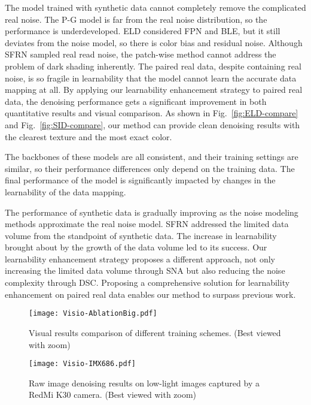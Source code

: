 \documentclass[sigconf,screen,nonacm]{acmart}
\begin{document}
The model trained with synthetic data cannot completely remove the complicated real noise. The P-G model is far from the real noise distribution, so the performance is underdeveloped. ELD considered FPN and BLE, but it still deviates from the noise model, so there is color bias and residual noise. Although SFRN sampled real read noise, the patch-wise method cannot address the problem of dark shading inherently. The paired real data, despite containing real noise, is so fragile in learnability that the model cannot learn the accurate data mapping at all. By applying our learnability enhancement strategy to paired real data, the denoising performance gets a significant improvement in both quantitative results and visual comparison. As shown in Fig.~\ref{fig:ELD-compare} and Fig.~\ref{fig:SID-compare}, our method can provide clean denoising results with the clearest texture and the most exact color.

The backbones of these models are all consistent, and their training settings are similar, so their performance differences only depend on the training data.
    The final performance of the model is significantly impacted by changes in the learnability of the data mapping.

The performance of synthetic data is gradually improving as the noise modeling methods approximate the real noise model.
    SFRN addressed the limited data volume from the standpoint of synthetic data. The increase in learnability brought about by the growth of the data volume led to its success.
    Our learnability enhancement strategy proposes a different approach, not only increasing the limited data volume through SNA but also reducing the noise complexity through DSC. Proposing a comprehensive solution for learnability enhancement on paired real data enables our method to surpass previous work.
    
    \begin{figure*}[t!]
        \texttt{[image: Visio-AblationBig.pdf]}
        \caption{Visual results comparison of different training schemes. (Best viewed with zoom)}
        \label{fig:ablation}
    \end{figure*}
    \begin{figure*}[t!]
        \texttt{[image: Visio-IMX686.pdf]}
\caption{Raw image denoising results on low-light images captured by a RedMi K30 camera. (Best viewed with zoom)}
        \label{fig:IMX686}
    \end{figure*}
\end{document}
